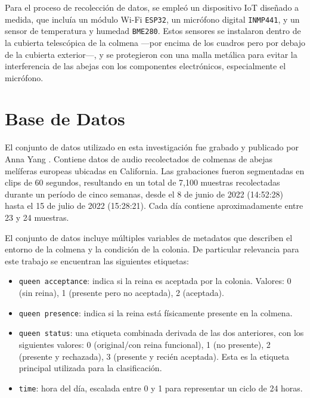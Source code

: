 \documentclass[12pt]{report}
\newenvironment{tightmulticols}{%
  \begin{multicols}{2}
  \setlength{\parskip}{0pt}
  \setlength{\parindent}{0em}
  \linespread{1}\selectfont
}{%
  \end{multicols}
}
\begin{document}
\begin{tightmulticols}
\par Para el proceso de recolección de datos, se empleó un dispositivo IoT diseñado a medida, que incluía un módulo Wi-Fi \texttt{ESP32}, un micrófono digital \texttt{INMP441}, y un sensor de temperatura y humedad \texttt{BME280}. Estos sensores se instalaron dentro de la cubierta telescópica de la colmena —por encima de los cuadros pero por debajo de la cubierta exterior—, y se protegieron con una malla metálica para evitar la interferencia de las abejas con los componentes electrónicos, especialmente el micrófono.

\section{Base de Datos}

\par El conjunto de datos utilizado en esta investigación fue grabado y publicado por Anna Yang \cite{AnnaYang-Dataset}. Contiene datos de audio recolectados de colmenas de abejas melíferas europeas ubicadas en California. Las grabaciones fueron segmentadas en clips de 60 segundos, resultando en un total de 7,100 muestras recolectadas durante un período de cinco semanas, desde el 8 de junio de 2022 (14:52:28) hasta el 15 de julio de 2022 (15:28:21). Cada día contiene aproximadamente entre 23 y 24 muestras.

\par El conjunto de datos incluye múltiples variables de metadatos que describen el entorno de la colmena y la condición de la colonia. De particular relevancia para este trabajo se encuentran las siguientes etiquetas:

\begin{itemize}
	\item[\ding{43}] \texttt{queen acceptance}: indica si la reina es aceptada por la colonia. Valores: 0 (sin reina), 1 (presente pero no aceptada), 2 (aceptada).
	\item[\ding{43}] \texttt{queen presence}: indica si la reina está físicamente presente en la colmena.
	\item[\ding{43}] \texttt{queen status}: una etiqueta combinada derivada de las dos anteriores, con los siguientes valores: 0 (original/con reina funcional), 1 (no presente), 2 (presente y rechazada), 3 (presente y recién aceptada). Esta es la etiqueta principal utilizada para la clasificación.
	\item[\ding{43}] \texttt{time}: hora del día, escalada entre 0 y 1 para representar un ciclo de 24 horas.
\end{itemize}


\end{tightmulticols}
\end{document}
